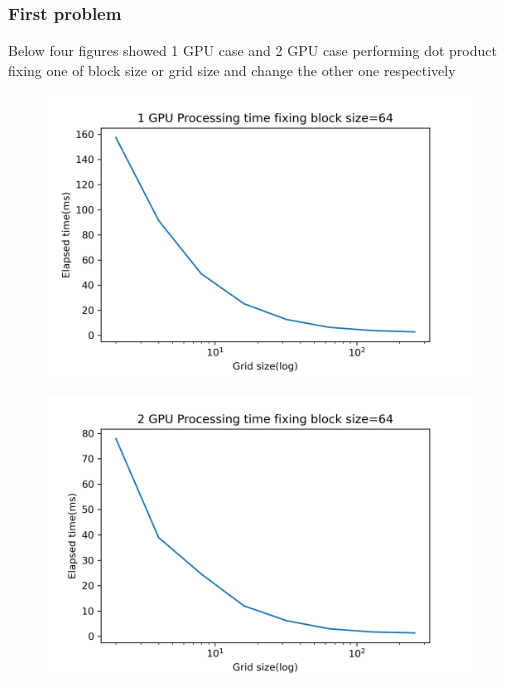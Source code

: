 \documentclass{article}
\begin{document}
	\subsubsection{First problem}
	Below four figures showed 1 GPU case and 2 GPU case performing dot product fixing one of block size or grid size and change the other one respectively
	\newpage
	\begin{figure}
		\centering
		\includegraphics[width=\linewidth]{notebook/1gpu_processing_time_fix_block}
	\end{figure}
	\begin{figure}[hb!]
		\centering
		\includegraphics[width=\linewidth]{notebook/2gpu_processing_time_fix_block}
	\end{figure}
	\newpage
\end{document}
